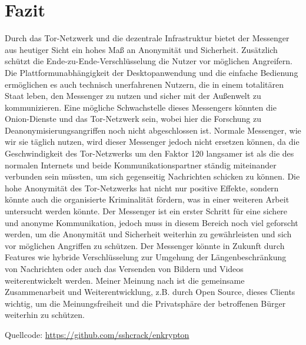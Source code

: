 \documentclass[a4paper,ngerman, headheight=28pt,12pt]{scrartcl}
\begin{document}
\section{Fazit}
Durch das Tor-Netzwerk und die dezentrale Infrastruktur bietet der Messenger aus heutiger Sicht ein hohes Maß an Anonymität und Sicherheit. Zusätzlich schützt die Ende-zu-Ende-Verschlüsselung die Nutzer vor möglichen Angreifern. Die Plattformunabhängigkeit der Desktopanwendung und die einfache Bedienung ermöglichen es auch technisch unerfahrenen Nutzern, die in einem totalitären Staat leben, den Messenger zu nutzen und sicher mit der Außenwelt zu kommunizieren. Eine mögliche Schwachstelle dieses Messengers könnten die Onion-Dienste und das Tor-Netzwerk sein, wobei hier die Forschung zu Deanonymisierungsangriffen noch nicht abgeschlossen ist.
Normale Messenger, wie wir sie täglich nutzen, wird dieser Messenger jedoch nicht ersetzen können, da die Geschwindigkeit des Tor-Netzwerks um den Faktor 120 langsamer ist als die des normalen Internets und beide Kommunikationspartner ständig miteinander verbunden sein müssten, um sich gegenseitig Nachrichten schicken zu können. Die hohe Anonymität des Tor-Netzwerks hat nicht nur positive Effekte, sondern könnte auch die organisierte Kriminalität fördern, was in einer weiteren Arbeit untersucht werden könnte. Der Messenger ist ein erster Schritt für eine sichere und anonyme Kommunikation, jedoch muss in diesem Bereich noch viel geforscht werden, um die Anonymität und Sicherheit weiterhin zu gewährleisten und sich vor möglichen Angriffen zu schützen. Der Messenger könnte in Zukunft durch Features wie hybride Verschlüsselung zur Umgehung der Längenbeschränkung von Nachrichten oder auch das Versenden von Bildern und Videos weiterentwickelt werden. Meiner Meinung nach ist die gemeinsame Zusammenarbeit und Weiterentwicklung, z.B. durch Open Source, dieses Clients wichtig, um die Meinungsfreiheit und die Privatsphäre der betroffenen Bürger weiterhin zu schützen.
\pagebreak
\nolinenumbers{}
\printbibliography[notkeyword={figure}]
\label{LastPageDoc}

\pagebreak
{}%
\appendix
\printbibliography[heading=subbibliography,title={Anhang},keyword={figure}]
Quellcode: \href{https://github.com/sshcrack/enkrypton}{https://github.com/sshcrack/enkrypton}

\end{document}
